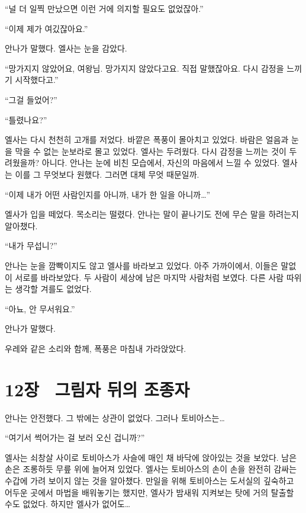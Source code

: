 ``널 더 일찍 만났으면 이런 거에 의지할 필요도 없었잖아.''

`` 이제 제가 여깄잖아요.''

안나가 말했다. 엘사는 눈을 감았다.

``망가지지 않았어요, 여왕님. 망가지지 않았다고요. 직접 말했잖아요. 다시 감정을 느끼기 시작했다고.''

``그걸 들었어?''

``틀렸나요?''

엘사는 다시 천천히 고개를 저었다. 바깥은 폭풍이 몰아치고 있었다. 바람은 얼음과 눈을 막을 수 없는 눈보라로 몰고 있었다. 엘사는 두려웠다. 다시 감정을 느끼는 것이 두려웠을까? 아니다. 안나는 눈에 비친 모습에서, 자신의 마음에서 느낄 수 있었다. 엘사는 이를 그 무엇보다 원했다. 그러면 대체 무엇 때문일까.

``이제 내가 어떤 사람인지를 아니까, 내가 한 일을 아니까\ldots''

엘사가 입을 떼었다. 목소리는 떨렸다. 안나는 말이 끝나기도 전에 무슨 말을 하려는지 알아챘다.

``내가 무섭니?''

안나는 눈을 깜빡이지도 않고 엘사를 바라보고 있었다. 아주 가까이에서, 이들은 말없이 서로를 바라보았다. 두 사람이 세상에 남은 마지막 사람처럼 보였다. 다른 사람 따위는 생각할 겨를도 없었다.

``아뇨, 안 무서워요.''

안나가 말했다.

우레와 같은 소리와 함께, 폭풍은 마침내 가라앉았다.



\chapter[12장  그림자 뒤의 조종자][12장\hspace*{.5em}그림자 뒤의 조종자]{12장 \ 그림자 뒤의 조종자}



안나는 안전했다. 그 밖에는 상관이 없었다. 그러나 토비아스는\ldots

``여기서 썩어가는 걸 보러 오신 겁니까?''

엘사는 쇠창살 사이로 토비아스가 사슬에 매인 채 바닥에 앉아있는 것을 보았다. 남은 손은 조롱하듯 무릎 위에 늘어져 있었다. 엘사는 토비아스의 손이 손을 완전히 감싸는 수갑에 가려 보이지 않는 것을 알아챘다. 만일을 위해 토비아스는 도서실의 깊숙하고 어두운 곳에서 마법을 배워놓기는 했지만, 엘사가 밤새워 지켜보는 탓에 거의 탈출할 수도 없었다. 하지만 엘사가 없어도\ldots

